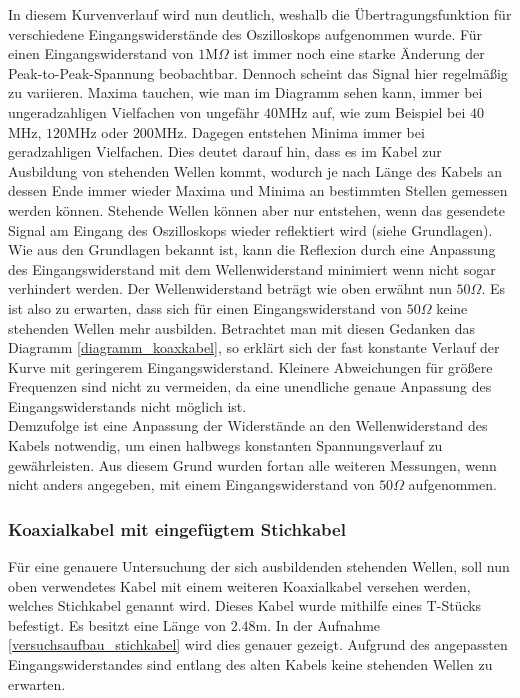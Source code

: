 		In diesem Kurvenverlauf wird nun deutlich, weshalb die Übertragungsfunktion für verschiedene Eingangswiderstände des Oszilloskops aufgenommen wurde.
		Für einen Eingangswiderstand von $1$M$\Omega$ ist immer noch eine starke Änderung der Peak-to-Peak-Spannung beobachtbar.
		Dennoch scheint das Signal hier regelmäßig zu variieren. 
		Maxima tauchen, wie man im Diagramm sehen kann, immer bei ungeradzahligen Vielfachen von ungefähr $40$MHz auf, wie zum Beispiel bei $40$MHz, $120$MHz oder $200$MHz.
		Dagegen entstehen Minima immer bei geradzahligen Vielfachen.
		Dies deutet darauf hin, dass es im Kabel zur Ausbildung von stehenden Wellen kommt, wodurch je nach Länge des Kabels an dessen Ende immer wieder Maxima und Minima an bestimmten Stellen gemessen werden können.
		Stehende Wellen können aber nur entstehen, wenn das gesendete Signal am Eingang des Oszilloskops wieder reflektiert wird (siehe Grundlagen).
		Wie aus den Grundlagen bekannt ist, kann die Reflexion durch eine Anpassung des Eingangswiderstand mit dem Wellenwiderstand minimiert wenn nicht sogar verhindert werden.
		Der Wellenwiderstand beträgt wie oben erwähnt nun $50\Omega$.
		Es ist also zu erwarten, dass sich für einen Eingangswiderstand von $50\Omega$ keine stehenden Wellen mehr ausbilden.
		Betrachtet man mit diesen Gedanken das Diagramm \ref{diagramm_koaxkabel}, so erklärt sich der fast konstante Verlauf der Kurve mit geringerem Eingangswiderstand.
		Kleinere Abweichungen für größere Frequenzen sind nicht zu vermeiden, da eine unendliche genaue Anpassung des Eingangswiderstands nicht möglich ist. \\

		Demzufolge ist eine Anpassung der Widerstände an den Wellenwiderstand des Kabels notwendig, um einen halbwegs konstanten Spannungsverlauf zu gewährleisten.
		Aus diesem Grund wurden fortan alle weiteren Messungen, wenn nicht anders angegeben, mit einem Eingangswiderstand von $50\Omega$ aufgenommen. 


	\subsubsection{Koaxialkabel mit eingefügtem Stichkabel} %
	\label{ssub:koaxialkabel_mit_eingef_gtem_stichkabel}

		Für eine genauere Untersuchung der sich ausbildenden stehenden Wellen, soll nun oben verwendetes Kabel mit einem weiteren Koaxialkabel versehen werden, welches Stichkabel genannt wird.
		Dieses Kabel wurde mithilfe eines T-Stücks befestigt.
		Es besitzt eine Länge von $2.48$m.
		In der Aufnahme \ref{versuchsaufbau_stichkabel} wird dies genauer gezeigt.
		Aufgrund des angepassten Eingangswiderstandes sind entlang des alten Kabels keine stehenden Wellen zu erwarten.

